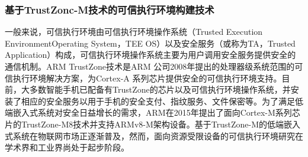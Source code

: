 \documentclass[12pt,a4paper]{ctexart}
\begin{document}
\subsubsection{基于TrustZonc-M技术的可信执行环境构建技术}
一般来说，可信执行环境由可信执行环境操作系统（Trusted Execution EnvironmentOperating System，TEE OS）以及安全服务（或称为TA，Trusted Application）构成，可信执行环境操作系统主要为用户调用安全服务提供安全的通信机制。ARM TrustZone技术是ARM 公司2008年提出的处理器级系统范围的可信执行环境解决方案，为Cortex-A 系列芯片提供安全的可信执行环境支持。目前，大多数智能手机已配备有TrustZone的芯片以及可信执行环境操作系统，并安装了相应的安全服务以用于手机的安全支付、指纹服务、文件保密等。为了满足低端嵌入式系统对安全日益增长的需求，ARM在2015年提出了面向Cortex-M系列芯片的TrustZone-M8技术并支持ARMv8-M架构设备。基于TrustZone-M的低端嵌入式系统在物联网市场正逐渐普及，然而，面向资源受限设备的可信执行环境研究在学术界和工业界尚处于起步阶段。
\end{document}
